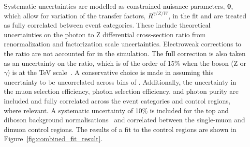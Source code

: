 Systematic uncertainties are modelled as constrained nuisance parameters,
$\boldsymbol{\theta}$, which allow for variation of the transfer factors,
$R^{\gamma/Z/W}$, in the fit and are treated as fully correlated between event
categories.  These include theoretical uncertainties on the photon to Z
differential cross-section ratio from renormalization and factorization scale
uncertainties.  Electroweak corrections to the ratio are not accounted for in
the simulation. The full correction is also taken as an uncertainty on the
ratio, which is of the order of 15\% when the boson (Z or $\gamma$) \pt is at
the TeV scale~\cite{Kuhn:2005gv}. A conservative choice is made in assuming this
uncertainty to be uncorrelated across bins of \ETm. Additionally, the
uncertainty in the muon selection efficiency, photon selection efficiency, and
photon purity are included and fully correlated across the event categories and
control regions, where relevant. A systematic uncertainty of 10\% is included
for the top and diboson background normalisations~\cite{tagkey2015250} and
correlated between the single-muon and dimuon control regions. The results of a
fit to the control regions are shown in Figure~\ref{fig:combined_fit_result}.
 
